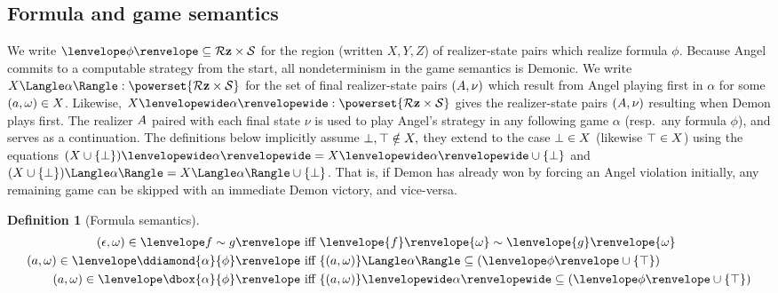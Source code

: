 \documentclass[12pt]{cmuthesis}
\theoremstyle{definition}
\newtheorem{definition}{Definition}
\theoremstyle{remark}
\newcommand{\allstate}{\mathcal{S}}
\newcommand{\lequiv}{\leftrightarrow}
\newcommand{\om}{\omega}
\newcommand{\DL}{\textsf{DL}\xspace}
\newcommand{\GL}{GL\xspace}
\newcommand{\tint}[2]{\lenvelope{#1}\renvelope{#2}}
\begin{document}

\subsection{Formula and game semantics}
We write $\fintR{\phi} \subseteq \allRz \times \allstate$ for the region (written $X,Y,Z$) of realizer-state pairs which realize formula $\phi$.
Because Angel commits to a computable strategy from the start, all nondeterminism in the game semantics is Demonic.
We write $\strategyforR[\alpha]{X} : \powerset{\allRz \times \allstate}$ for the set of final realizer-state pairs $(A,\nu)$ which result from Angel playing first in $\alpha$ for some $(\aa,\om) \in X$.
Likewise, $\dstrategyforR[\alpha]{X} : \powerset{\allRz \times \allstate}$ gives the realizer-state pairs $(A,\nu)$ resulting when Demon plays first.
The realizer $A$ paired with each final state $\nu$ is used to play Angel's strategy in any following game $\alpha$ (resp.\ any formula $\phi$), and serves as a continuation.
The definitions below implicitly assume $\bot, \top \notin X,$ they extend to the case $\bot \in X$ (likewise $\top \in X$) using the equations 
$\dstrategyforR[\alpha]{(X \cup \{\sff\})} = \dstrategyforR[\alpha]{X} \cup\{\sff\}$ and 
$\strategyforR[\alpha]{(X \cup \{\sff\})} = \strategyforR[\alpha]{X} \cup\{\sff\}$.
That is, if Demon has already won by forcing an Angel violation initially, any remaining game can be skipped with an immediate Demon victory, and vice-versa.
\begin{definition}[Formula semantics]
\begin{align*}
(\rzNil,\om) \in  \fintR{f \sim g}                 &\text{ iff } \tint{f}{\om} \sim \tint{g}{\om}\\
(\aa,\om) \in  \fintR{\ddiamond{\alpha}{\phi}}       &\text{ iff } \strategyforR[\alpha]{\{(\aa,\om)\}} \subseteq (\fintR{\phi} \cup \{\stt\})\\
(\aa,\om) \in  \fintR{\dbox{\alpha}{\phi}}              &\text{ iff } \dstrategyforR[\alpha]{\{(\aa,\om)\}} \subseteq (\fintR{\phi} \cup \{\stt\})
\end{align*}
\end{definition}
\end{document}
